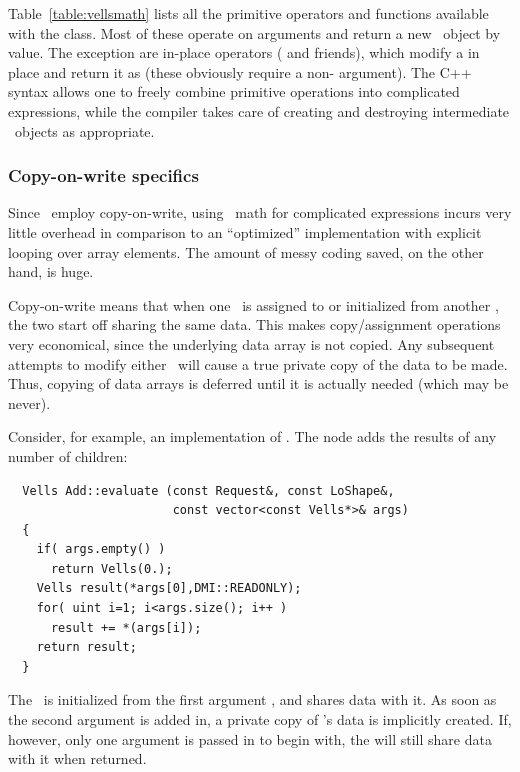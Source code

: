   Table~\ref{table:vellsmath} lists all the primitive operators and functions 
  available with the  class. Most of these operate on 
  arguments and return a new \Vells\ object by value. The exception are 
  in-place operators ( and friends), which modify a  in
  place and return it as  (these obviously require a
  non- argument). The C++ syntax allows one to freely combine
  primitive operations into complicated expressions, while the compiler takes
  care of creating and destroying intermediate \Vells\ objects as appropriate.

  \subsubsection{Copy-on-write specifics}

  Since \Vells\ employ copy-on-write, using \Vells\ math for complicated
  expressions incurs very little overhead in comparison to an ``optimized''
  implementation with explicit looping over array elements. The amount of
  messy coding saved, on the other hand, is huge. 
  
  Copy-on-write means that when one \Vells\ is assigned to or initialized from
  another \Vells, the two start off sharing the same data. This makes 
  copy/assignment operations very economical, since the underlying data array 
  is not copied. Any subsequent attempts to modify either \Vells\ will cause a
  true private copy of the data to be made. Thus, copying of data arrays is
  deferred until it is actually needed (which may be never). 

  Consider, for example, an implementation of . The 
  node adds the results of any number of children:

  \begin{verbatim}  
  Vells Add::evaluate (const Request&, const LoShape&,
                       const vector<const Vells*>& args)
  {
    if( args.empty() )
      return Vells(0.);
    Vells result(*args[0],DMI::READONLY);
    for( uint i=1; i<args.size(); i++ )
      result += *(args[i]);
    return result;
  }
  \end{verbatim}  
  
  The  \Vells\ is initialized from the first argument \Vells, and
  shares data with it. As soon as the second argument is added in, a private 
  copy of 's data is implicitly created. If, however, only one
  argument is passed in to begin with, the  will still share data
  with it when returned.

  
  
